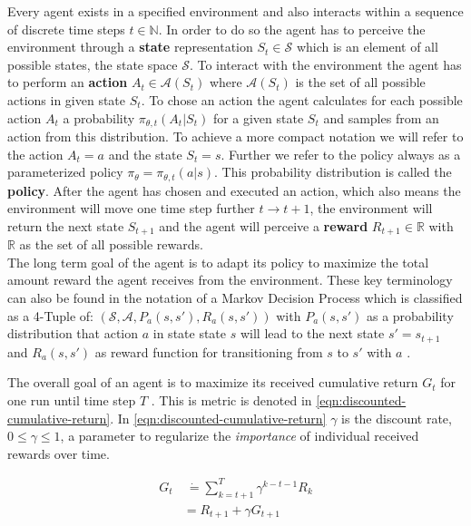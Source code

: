 Every agent exists in a specified environment and also interacts within a sequence of discrete time steps $t \in \mathbb{N}$. In order to do so the agent has to perceive the environment through a \textbf{state} representation $S_t \in \mathcal{S}$ which is an element of all possible states, the state space $\mathcal{S}$. To interact with the environment the agent has to perform an \textbf{action} $A_t \in \mathcal{A}(S_t)$ where $\mathcal{A}(S_t)$ is the set of all possible actions in given state $S_t$. To chose an action the agent calculates for each possible action $A_t$ a probability $\pi_{\theta, t}(A_t|S_t)$ for a given state $S_t$ and samples from an action from this distribution. To achieve a more compact notation we will refer to the action $A_t = a$ and the state $S_t = s$. Further we refer to the policy always as a parameterized policy $\pi_\theta = \pi_{\theta, t}(a|s)$.  
This probability distribution is called the \textbf{policy}. 
After the agent has chosen and executed an action, which also means the environment will move one time step further $t \to t + 1$, the environment will return the next state $S_{t+1}$ and the agent will perceive a \textbf{reward} $R_{t+1} \in \mathbb{R}$ with $\mathbb{R}$ as the set of all possible rewards.\\
The long term goal of the agent is to adapt its policy to maximize the total amount reward the agent receives from the environment.
These key terminology can also be found in the notation of a Markov Decision Process which is classified as a 4-Tuple of: $(\mathcal{S}, \mathcal{A}, P_a(s, s'), R_a(s, s'))$ with $ P_a(s, s')$ as a probability distribution that action $a$ in state state $s$ will lead to the next state $s' = s_{t+1}$ and $ R_a(s, s')$ as reward function for transitioning from $s$ to $s'$ with $a$ \cite{SuttonBartoRLBook}.

The overall goal of an agent is to maximize its received cumulative return $G_t$ for one run until time step $T$ \cite{SuttonBartoRLBook}. This is metric is denoted in \eqref{eqn:discounted-cumulative-return}. In \eqref{eqn:discounted-cumulative-return} $\gamma$ is the discount rate, $0 \leq \gamma \leq 1$, a parameter to regularize the \textit{importance} of individual received rewards over time. 

\begin{align}
	G_t & \ \dot{=} \sum_{k=t+1}^T \gamma^{k-t-1}R_k \label{eqn:discounted-cumulative-return} \\
	&= R_{t+1} + \gamma G_{t+1} \label{eqn:discounted-cumulative-return-recursive}
\end{align}

